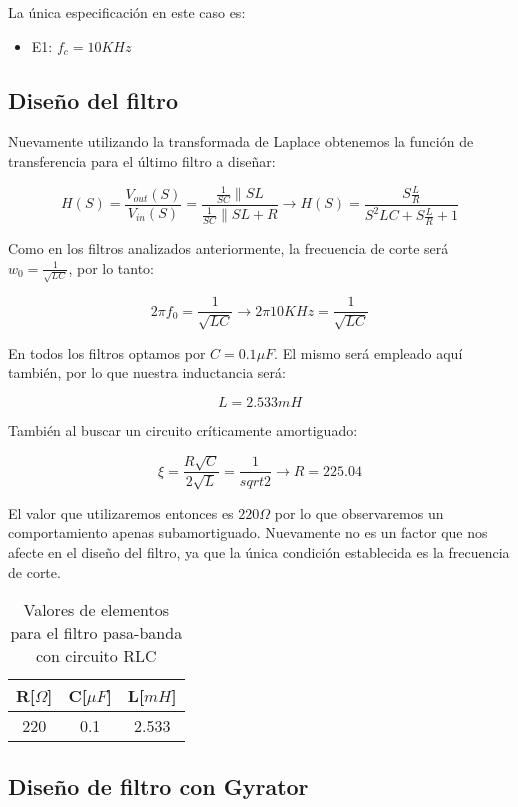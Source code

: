 La única especificación en este caso es:

\begin{itemize}
	\item E1: $f_c=10 KHz$
\end{itemize}

\subsection{Diseño del filtro}

Nuevamente utilizando la transformada de Laplace obtenemos la función de transferencia para el último filtro
a diseñar:

$$H(S)=\frac{V_{out}(S)}{V_{in}(S)}=\frac{\frac{1}{SC}\parallel SL}{\frac{1}{SC}\parallel SL + R} \longrightarrow 
H(S)=\frac{S\frac{L}{R}}{S^2LC+S\frac{L}{R}+1}$$

Como en los filtros analizados anteriormente, la frecuencia de corte
será $w_0=\frac{1}{\sqrt{LC}}$, por lo tanto:

$$2 \pi f_0 = \frac{1}{\sqrt{LC}} \longrightarrow 2 \pi 10KHz = \frac{1}{\sqrt{LC}}$$

En todos los filtros optamos por $C=0.1 \mu F$. El mismo será empleado aquí también, por lo que nuestra inductancia será:

$$L = 2.533 mH$$

También al buscar un circuito críticamente amortiguado:

$$\xi=\frac{R \sqrt{C}}{2\sqrt{L}}=\frac{1}{sqrt{2}} \longrightarrow R=225.04$$

El valor que utilizaremos entonces es $220 \Omega$ por lo que observaremos un comportamiento apenas subamortiguado.
Nuevamente no es un factor que nos afecte en el diseño del filtro, ya que la única condición establecida es la frecuencia
de corte.

\begin{table}[H]
    \centering
    \begin{tabular}{|c|c|c|}
    \hline
    \rowcolor[HTML]{C0C0C0} 
    R[$\Omega$] & C[$\mu F$] & L[$mH$]  \\ \hline
    220     & 0.1  & 2.533 \\ \hline
    \end{tabular}
    \caption{Valores de elementos para el filtro pasa-banda con circuito RLC}
    \end{table}

\subsection{Diseño de filtro con Gyrator}


